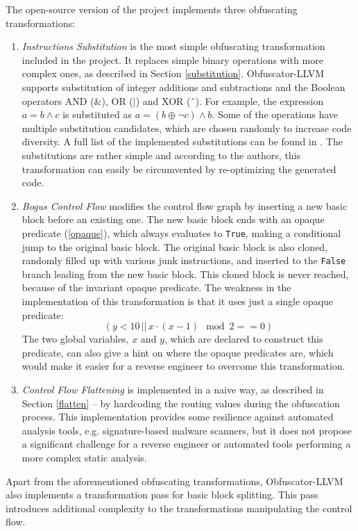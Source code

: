 \documentclass[
  digital, %
  notable,   %
  twoside, %
  nolof,     %
  nolot,     %
]{fithesis3}
\theoremstyle{definition}
\begin{document}
The open-source version of the project implements three obfuscating transformations:
\begin{enumerate}
    \item \textit{Instructions Substitution} is the most simple obfuscating transformation included in the project. It replaces simple binary operations with more complex ones, as described in Section \ref{substitution}. Obfuscator-LLVM supports substitution of integer additions and subtractions and the Boolean operators  AND  ($\&$),  OR  ($|$)  and  XOR  (ˆ). For example, the expression $a = b \wedge c$ is substituted as $a = (b \oplus \neg c) \wedge b$. Some of the operations have multiple substitution candidates, which are chosen randomly to increase code diversity. A full list of the implemented substitutions can be found in \cite{obfuscator-llvm}. The substitutions are rather simple and according to the authors, this transformation  can easily  be  circumvented  by  re-optimizing  the  generated  code.
    \item \textit{Bogus Control Flow} modifies the control flow graph by inserting a new basic block before an existing one. The new basic block ends with an opaque predicate (\ref{opaque}), which always evaluates to \texttt{True}, making a conditional jump to the original basic block. The original basic block is also cloned, randomly filled up with various junk instructions, and inserted to the \texttt{False} branch leading from the new basic block. This cloned block is never reached, because of the invariant opaque predicate. The weakness in the implementation of this transformation is that it uses just a single opaque predicate: $$(y < 10\, ||\, x \cdot (x - 1) \mod 2 == 0)$$ The two global variables, $x$ and $y$, which are declared to construct this predicate, can also give a hint on where the opaque predicates are, which would make it easier for a reverse engineer to overcome this transformation. 
    \item \textit{Control Flow Flattening} is implemented in a naive way, as described in Section \ref{flatten} -- by hardcoding the routing values during the obfuscation process. This implementation provides some resilience against automated analysis tools, e.g. signature-based malware scanners, but it does not propose a significant challenge for a reverse engineer or automated tools performing a more complex static analysis.
\end{enumerate}

Apart from the aforementioned obfuscating transformations, Obfuscator-LLVM also implements a transformation pass for basic block splitting. This pass introduces additional complexity to the transformations manipulating the control flow. 
\end{document}
